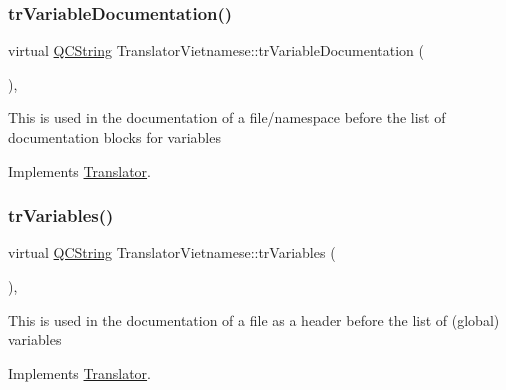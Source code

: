 \mbox{\label{class_translator_vietnamese_a0d5dfc1c20351a50c475f4de8b25782c}} 
\subsubsection{\texorpdfstring{trVariableDocumentation()}{trVariableDocumentation()}}
{\footnotesize\ttfamily virtual \mbox{\hyperlink{class_q_c_string}{Q\+C\+String}} Translator\+Vietnamese\+::tr\+Variable\+Documentation (\begin{DoxyParamCaption}{ }\end{DoxyParamCaption})\hspace{0.3cm}{\ttfamily [inline]}, {\ttfamily [virtual]}}

This is used in the documentation of a file/namespace before the list of documentation blocks for variables 

Implements \mbox{\hyperlink{class_translator}{Translator}}.

\mbox{\label{class_translator_vietnamese_ae1fc58e63cc9ef429f6641d54adda787}} 
\subsubsection{\texorpdfstring{trVariables()}{trVariables()}}
{\footnotesize\ttfamily virtual \mbox{\hyperlink{class_q_c_string}{Q\+C\+String}} Translator\+Vietnamese\+::tr\+Variables (\begin{DoxyParamCaption}{ }\end{DoxyParamCaption})\hspace{0.3cm}{\ttfamily [inline]}, {\ttfamily [virtual]}}

This is used in the documentation of a file as a header before the list of (global) variables 

Implements \mbox{\hyperlink{class_translator}{Translator}}.

\mbox{\label{class_translator_vietnamese_a95b6001c8ec477cf2e10182cf773bbfa}} 
